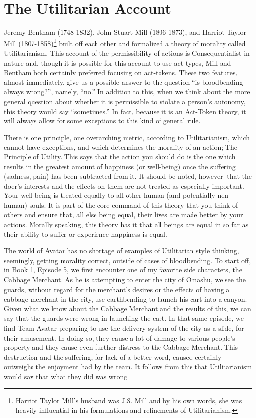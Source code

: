 \section{The Utilitarian Account} 

Jeremy Bentham (1748-1832)\autocite{Bentham1}, John Stuart Mill (1806-1873)\autocite{Mill1}, and Harriot Taylor Mill (1807-1858)\footnote{Harriot Taylor Mill’s husband was J.S. Mill and by his own words, she was heavily influential in his formulations and refinements of Utilitarianism.} built off each other and formalized a theory of morality called Utilitarianism. This account of the permissibility of actions is Consequentialist in nature and, though it is possible for this account to use act-types, Mill and Bentham both certainly preferred focusing on act-tokens. These two features, almost immediately, give us a possible answer to the question “is bloodbending always wrong?”, namely, “no.” In addition to this, when we think about the more general question about whether it is permissible to violate a person’s autonomy, this theory would say “sometimes.” In fact, because it is an Act-Token theory, it will always allow for some exceptions to this kind of general rule.

There is one principle, one overarching metric, according to Utilitarianism, which cannot have exceptions, and which determines the morality of an action; The Principle of Utility.\autocite[pg.12]{Bentham1} This says that the action you should do is the one which results in the greatest amount of happiness (or well-being) once the suffering (sadness, pain) has been subtracted from it. It should be noted, however, that the doer’s interests and the effects on them are not treated as especially important. Your well-being is treated equally to all other human (and potentially non-human) souls. It is part of the core command of this theory that you think of others and ensure that, all else being equal, their lives are made better by your actions. Morally speaking, this theory has it that all beings are equal in so far as their ability to suffer or experience happiness is equal.\autocite[pg.245]{Bentham1}

The world of Avatar has no shortage of examples of Utilitarian style thinking, seemingly, getting morality correct, outside of cases of bloodbending. To start off, in Book 1, Episode 5, we first encounter one of my favorite side characters, the Cabbage Merchant. As he is attempting to enter the city of Omashu, we see the guards, without regard for the merchant’s desires or the effects of having a cabbage merchant in the city, use earthbending to launch his cart into a canyon.\autocite[02:53-03:07]{Omashu1} Given what we know about the Cabbage Merchant and the results of this, we can say that the guards were wrong in launching the cart. In that same episode, we find Team Avatar preparing to use the delivery system of the city as a slide, for their amusement. In doing so, they cause a lot of damage to various people’s property and they cause even further distress to the Cabbage Merchant.\autocite[04:54-07:29]{Omashu1} This destruction and the suffering, for lack of a better word, caused certainly outweighs the enjoyment had by the team. It follows from this that Utilitarianism would say that what they did was wrong. 

